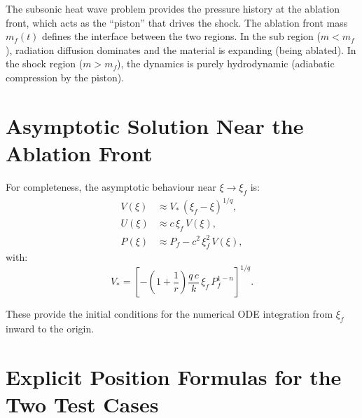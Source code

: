 \documentclass[11pt]{article}
\begin{document}
\begin{notebox}
The subsonic heat wave problem provides the pressure history at the ablation front, which acts as the ``piston'' that drives the shock. The ablation front mass $m_f(t)$ defines the interface between the two regions. In the sub region ($m < m_f$), radiation diffusion dominates and the material is expanding (being ablated). In the shock region ($m > m_f$), the dynamics is purely hydrodynamic (adiabatic compression by the piston).
\end{notebox}

\section{Asymptotic Solution Near the Ablation Front}
\label{sec:asymptotics}

For completeness, the asymptotic behaviour near $\xi \to \xi_f$ is:
\begin{align}
  V(\xi) &\approx V_*\,(\xi_f - \xi)^{1/q}, \label{eq:V_asymp}\\
  U(\xi) &\approx c\,\xi_f\,V(\xi), \label{eq:U_asymp}\\
  P(\xi) &\approx P_f - c^2\,\xi_f^2\,V(\xi), \label{eq:P_asymp}
\end{align}
with:
\begin{equation}
  V_* = \left[-\left(1+\frac{1}{r}\right)\frac{q\,c}{k}\,\xi_f\,P_f^{1-n}\right]^{1/q}.
  \label{eq:Vstar}
\end{equation}

These provide the initial conditions for the numerical ODE integration from $\xi_f$ inward to the origin.

\section{Explicit Position Formulas for the Two Test Cases}
\label{sec:explicit_positions}
\end{document}
